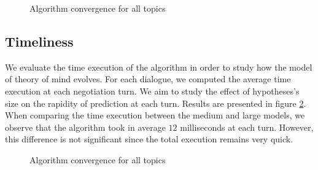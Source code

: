 \documentclass[conference, letterpaper]{IEEEtran}
\begin{document}
	\begin{figure}[]
		\caption{Algorithm convergence for all topics} 
		\label{fig:converge}
	\end{figure}
	
	
	\subsection{Timeliness}
	We evaluate the time execution of the algorithm in order to study how the model of theory of mind evolves. For each dialogue, we computed the average time execution at each negotiation turn. We aim to study the effect of hypotheses's size on the rapidity of prediction at each turn. Results are presented in figure \ref{fig:time}. When comparing the time execution between the medium and large models, we observe that the algorithm took in average $12$ milliseconds at each turn. However, this difference is not significant since the total execution remains very quick.
	
	\begin{figure}[]
		\caption{Algorithm convergence for all topics} 
		\label{fig:time}
	\end{figure}
	
\end{document}
